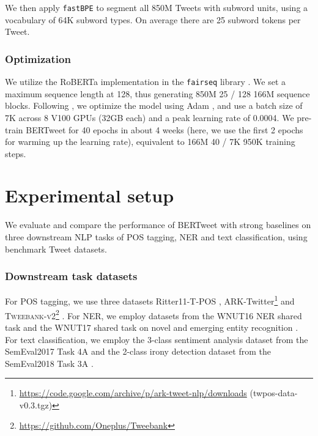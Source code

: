 \documentclass[11pt,a4paper]{article}
\begin{document}
We then apply \texttt{fastBPE} \citep{sennrich-etal-2016-neural} to segment all 850M Tweets with subword units, using a vocabulary of 64K subword types. On average there are 25 subword tokens per Tweet. 





\subsubsection*{Optimization}
We utilize the RoBERTa implementation in the \texttt{fairseq} library \citep{ott2019fairseq}. We set a maximum sequence length at  128, thus generating  850M  25 / 128  166M sequence blocks. Following , we optimize the model using Adam \citep{KingmaB14}, and use a batch size of 7K across 8 V100 GPUs (32GB each) and a peak learning rate of 0.0004. We pre-train BERTweet for 40 epochs   in  about {4} weeks (here, we use the first 2 epochs for warming up the learning rate), equivalent to 166M  40 / 7K  950K training steps.




\section{Experimental setup}

We evaluate and compare the performance of BERTweet with strong baselines on three downstream NLP tasks of POS tagging, NER and text classification, using benchmark Tweet datasets. 
 

\subsubsection*{Downstream task datasets} 
For POS tagging, we use three datasets Ritter11-T-POS \cite{ritter-etal-2011-named}, ARK-Twitter\footnote{\url{https://code.google.com/archive/p/ark-tweet-nlp/downloads} (twpos-data-v0.3.tgz) } 
\citep{gimpel-etal-2011-part,owoputi-etal-2013-improved} and \textsc{Tweebank-v2}\footnote{\url{https://github.com/Oneplus/Tweebank}} 
\citep{liu-etal-2018-parsing}. For NER, we employ datasets from the WNUT16 NER shared task 
\citep{strauss-etal-2016-results} and the WNUT17 shared task 
on novel and emerging entity recognition \citep{derczynski-etal-2017-results}. For text classification, we employ the 3-class sentiment analysis dataset from the SemEval2017 Task 4A 
\citep{rosenthal-etal-2017-semeval} and the 2-class irony detection dataset from the SemEval2018 Task 3A 
\citep{van-hee-etal-2018-semeval}.
\end{document}
